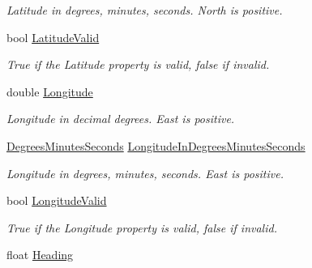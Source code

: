 \begin{DoxyCompactItemize}
\begin{DoxyCompactList}\small\item\em Latitude in degrees, minutes, seconds. North is positive. \item\end{DoxyCompactList}\item 
bool \hyperlink{class_g_p_s_mobile_1_1_gps_position_ab3d2aa57c9507dffc5c8a03b78fe34e0}{LatitudeValid}
\begin{DoxyCompactList}\small\item\em True if the Latitude property is valid, false if invalid. \item\end{DoxyCompactList}\item 
double \hyperlink{class_g_p_s_mobile_1_1_gps_position_add38fa11bc9116c7b1fa2e071b967002}{Longitude}
\begin{DoxyCompactList}\small\item\em Longitude in decimal degrees. East is positive. \item\end{DoxyCompactList}\item 
\hyperlink{class_g_p_s_mobile_1_1_degrees_minutes_seconds}{DegreesMinutesSeconds} \hyperlink{class_g_p_s_mobile_1_1_gps_position_a04b891a6cc52d96894fb41e03b166b81}{LongitudeInDegreesMinutesSeconds}
\begin{DoxyCompactList}\small\item\em Longitude in degrees, minutes, seconds. East is positive. \item\end{DoxyCompactList}\item 
bool \hyperlink{class_g_p_s_mobile_1_1_gps_position_ab6fb3a2e2b2a92c7c10de450ae1a76db}{LongitudeValid}
\begin{DoxyCompactList}\small\item\em True if the Longitude property is valid, false if invalid. \item\end{DoxyCompactList}\item 
float \hyperlink{class_g_p_s_mobile_1_1_gps_position_a457add962c7a355c6f72121e274df54b}{Heading}

\end{DoxyCompactItemize}
